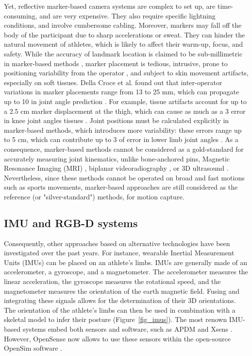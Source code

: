 Yet, reflective marker-based camera systems are complex to set up, are time-consuming, and are very expensive. They also require specific lightning conditions, and involve cumbersome cabling. Moreover, markers may fall off the body of the participant due to sharp accelerations or sweat. They can hinder the natural movement of athletes, which is likely to affect their warm-up, focus, and safety. While the accuracy of landmark location is claimed to be sub-millimetric in marker-based methods \cite{Topley2020}, marker placement is tedious, intrusive, prone to positioning variability from the operator \cite{Tsushima2003}, and subject to skin movement artifacts, especially on soft tissues. Della Croce et al. found out that inter-operator variations in marker placements range from 13 to 25 mm, which can propagate up to 10\degree{} in joint angle prediction \cite{Gorton2009,Croce1999}. For example, tissue artifacts account for up to a 2.5 cm marker displacement at the thigh, which can cause as much as a 3\degree{} error in knee joint angles tissues \cite{Benoit2015,Cappozzo1995}. Joint positions must be calculated explicitly in marker-based methods, which introduces more variability: these errors range up to 5 cm, which can contribute up to 3\degree{} of error in lower limb joint angles \cite{Leboeuf2019}. As a consequence, marker-based methods cannot be considered as a gold-standard for accurately measuring joint kinematics, unlike bone-anchored pins, Magnetic Resonance Imaging (MRI) \cite{Yahia2004}, biplanar videoradiography \cite{Miranda2013, Kessler2019}, or 3D ultrasound \cite{Peters2010}. Nevertheless, since these methods cannot be operated on broad and fast motions such as sports movements, marker-based approaches are still considered as the reference (or "silver-standard") methods, for motion capture.


\FloatBarrier
\subsection{IMU and RGB-D systems}

Consequently, other approaches based on alternative technologies have been investigated over the past years. For instance, wearable Inertial Measurement Units (IMUs) can be placed on an athlete's limbs. IMUs are generally made of an accelerometer, a gyroscope, and a magnetometer. The accelerometer measures the linear acceleration, the gyroscope measures the rotational speed, and the magnetometer measures the orientation of the earth magnetic field. Fusing and integrating these signals allows for the determination of their 3D orientations. The orientation of the athlete's limbs can then be used in combination with a skeletal model to infer their posture (Figure~\ref{fig_imus}). The most renown IMU-based systems embed both sensors and software, such as APDM \cite{APDM2022} and Xsens \cite{Xsens2022}. However, OpenSense now allows to use these sensors within the open-source OpenSim software \cite{Borno2022}.


